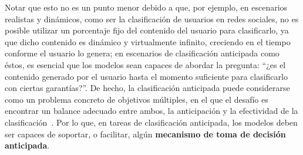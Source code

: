 Notar que esto no es un punto menor debido a que, por ejemplo, en escenarios realistas y dinámicos, como ser la clasificación de usuarios en redes sociales, no es posible utilizar un porcentaje fijo del contenido del usuario para clasificarlo, ya que dicho contenido es dinámico y virtualmente infinito, creciendo en el tiempo conforme el usuario lo genera; en escenarios de clasificación anticipada como éstos, es esencial que los modelos sean capaces de abordar la pregunta: ``¿es el contenido generado por el usuario hasta el momento suficiente para clasificarlo con ciertas garantías?''.
De hecho, la clasificación anticipada puede considerarse como un problema concreto de objetivos múltiples, en el que el desafío es encontrar un balance adecuado entre ambos, la anticipación y la efectividad de la clasificación~\cite{xing2010brief}.
Por lo que, en tareas de clasificación anticipada, los modelos deben ser capaces de soportar, o facilitar, algún \textbf{mecanismo de toma de decisión anticipada}.

